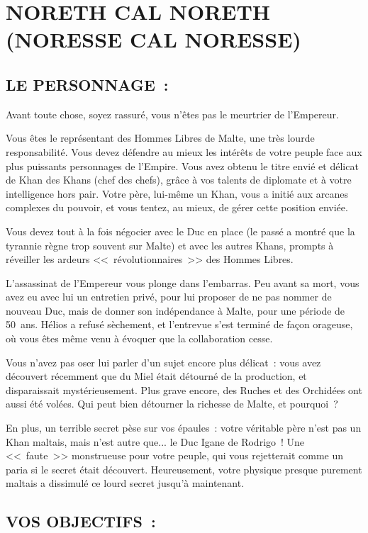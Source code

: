 \documentclass[14pt,twocolumn]{extarticle}
\begin{document}
\section{NORETH CAL NORETH\\(NORESSE CAL NORESSE)}

\subsection{LE PERSONNAGE~:}

Avant toute chose, soyez rassuré, vous n'êtes pas le meurtrier de l'Empereur.

Vous êtes le représentant des Hommes Libres de Malte, une très lourde
responsabilité. Vous devez défendre au mieux les intérêts de votre peuple face
aux plus puissants personnages de l'Empire. Vous avez obtenu le titre envié et
délicat de Khan des Khans (chef des chefs), grâce à vos talents de diplomate et
à votre intelligence hors pair. Votre père, lui-même un Khan, vous a initié
aux arcanes complexes du pouvoir, et vous tentez, au mieux, de gérer cette
position enviée.

Vous devez tout à la fois négocier avec le Duc en place (le passé a montré que
la tyrannie règne trop souvent sur Malte) et avec les autres Khans, prompts à
réveiller les ardeurs <<~révolutionnaires~>> des Hommes Libres.

L'assassinat de l'Empereur vous plonge dans l'embarras. Peu avant sa mort, vous
avez eu avec lui un entretien privé, pour lui proposer de ne pas nommer de
nouveau Duc, mais de donner son indépendance à Malte, pour une période de
50~ans. Hélios a refusé sèchement, et l'entrevue s'est terminé de façon
orageuse, où vous êtes même venu à évoquer que la collaboration cesse.

Vous n'avez pas oser lui parler d'un sujet encore plus délicat~: vous avez
découvert récemment que du Miel était détourné de la production, et
disparaissait mystérieusement. Plus grave encore, des Ruches et des Orchidées
ont aussi été volées. Qui peut bien détourner la richesse de Malte, et
pourquoi~?

En plus, un terrible secret pèse sur vos épaules~: votre véritable père n'est
pas un Khan maltais, mais n'est autre que... le Duc Igane de Rodrigo~! Une
<<~faute~>> monstrueuse pour votre peuple, qui vous rejetterait comme un
paria si le secret était découvert. Heureusement, votre physique presque
purement maltais a dissimulé ce lourd secret jusqu'à maintenant.

\subsection{VOS OBJECTIFS~:}
\end{document}
